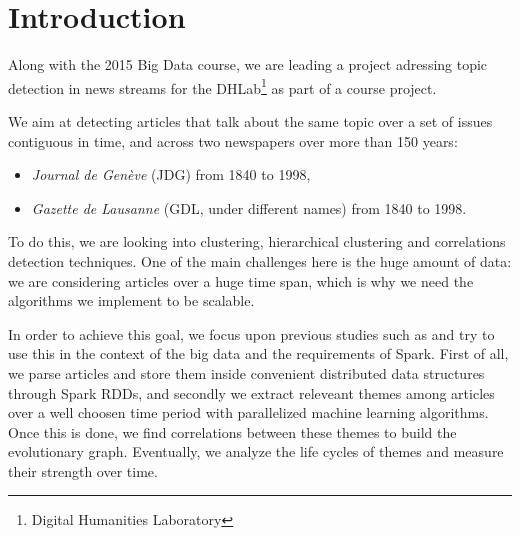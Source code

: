 \section{Introduction}
Along with the 2015 Big Data course, we are leading a project adressing topic detection in news streams for the DHLab\footnote{Digital Humanities Laboratory} as part of a course project.

We aim at detecting articles that talk about the same topic over a set of issues contiguous in time, and across two newspapers over more than 150 years:
\begin{itemize}
\item \emph{Journal de Genève} (JDG) from 1840 to 1998,
\item \emph{Gazette de Lausanne} (GDL, under different names) from 1840 to 1998.
\end{itemize}
 To do this, we are looking into clustering, hierarchical clustering and correlations detection techniques. One of the main challenges here is the huge amount of data: we are considering articles over a huge time span, which is why we need the algorithms we implement to be scalable.

In order to achieve this goal, we focus upon previous studies such as \cite{kdd05-ttm} and try to use this in the context of the big data and the requirements of Spark.
First of all, we parse articles and store them inside convenient distributed data structures through Spark RDDs, and secondly we extract releveant themes among articles over a well choosen time period with parallelized machine learning algorithms. Once this is done, we find correlations between these themes to build the evolutionary graph. Eventually, we analyze the life cycles of themes and measure their strength over time.
